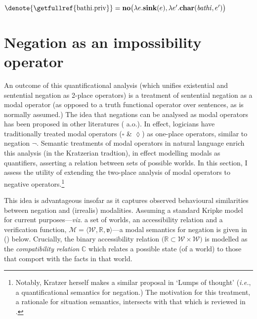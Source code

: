 	$ \denote{\textup{\getfullref{bathi.priv}}}=\textbf{no}\big(\lambda e.\textbf{sink}(e),\lambda e'.\textbf{char}(\mathit{bathi},e')\big) $
	
	\xe{}

\section{Negation as an impossibility operator}
An outcome of this quantificational analysis (which unifies existential and sentential negation as 2-place operators) is a treatment of sentential negation as a modal operator (as opposed to a truth functional operator over sentences, as is normally assumed.) The idea that negations can be analysed as modal operators has been proposed in other literatures (\citealp[see, \textit{e.g.},][]{Wansing2001,Restall1999,Horn2017,Dosen1986,Dunn1993} a.o.). In effect, logicians have traditionally treated modal operators ($ \square $ \& $\lozenge $) as one-place operators, similar to negation $ \boldsymbol\neg $. Semantic treatments of modal operators in natural language enrich this analysis (in the Kratzerian tradtion), in effect modelling modals as quantifiers, asserting a relation between sets of possible worlds. In this section, I assess the utility of extending the two-place analysis of modal operators to negative operators.\footnote{Notably, Kratzer herself makes a similar proposal in `Lumps of thought' \citeyearpar[\S~6]{Kratzer1989} (\textit{i.e.}, a quantificational semantics for negation.) The motivation for this treatment, a rationale for situation semantics, intersects with that which is reviewed in \citet[60\textit{ff}]{Restall1999}.}




 This idea is advantageous insofar as it captures observed behavioural similarities between negation and (irrealis) modalities. Assuming a standard Kripke model for current purposes---\textit{viz.} a set of worlds, an accessibility relation and a verification function, $ \mathcal M=\langle\mathcal{W\!},\mathbb{R,}\mathfrak{v} \rangle $---a modal semantics for negation is given in (\nextx) below. Crucially, the binary accessibility relation $ \big(\mathbb R\subset\mathcal W\times\mathcal W\big) $ is modelled as the \textit{compatibility relation} $ \mathbb{C}  $ which relates a possible state (of a world) to those that comport with the facts in that world.
 

